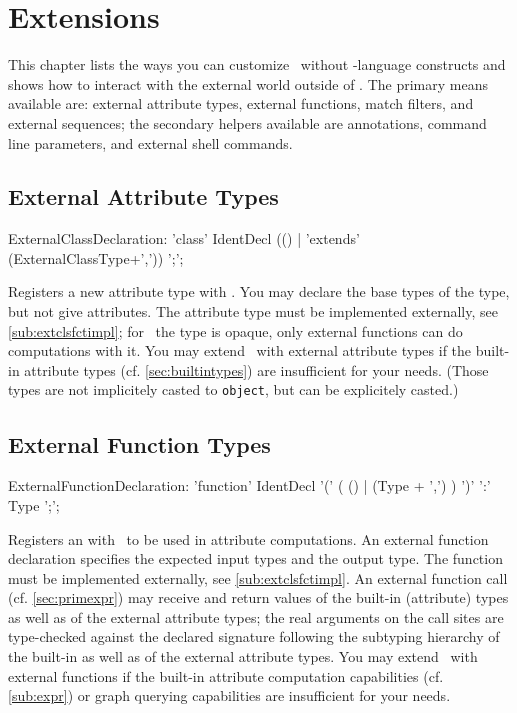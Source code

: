 \chapter{Extensions}\label{chapextensions}

This chapter lists the ways you can customize \GrG~without \GrG-language constructs and
shows how to interact with the external world outside of \GrG.
The primary means available are: external attribute types, external functions, match filters, and external sequences; the secondary helpers available are annotations, command line parameters, and external shell commands.

\section{External Attribute Types}\label{sub:extcls}
\begin{rail}
  ExternalClassDeclaration: 'class' IdentDecl (() | 'extends' (ExternalClassType+',')) ';';
\end{rail}
Registers a new attribute type with \GrG. You may declare the base types of the type, but not give attributes. The attribute type must be implemented externally, see \ref{sub:extclsfctimpl}; for \GrG~the type is opaque, only external functions can do computations with it. You may extend \GrG~with external attribute types if the built-in attribute types (cf. \ref{sec:builtintypes}) are insufficient for your needs.
(Those types are not implicitely casted to \texttt{object}, but can be explicitely casted.)

\section{External Function Types}\label{sub:extfct}
\begin{rail}
  ExternalFunctionDeclaration: 'function' IdentDecl '(' ( () | (Type + ',') ) ')' ':' Type ';';
\end{rail}
Registers an  with \GrG~to be used in attribute computations.
An external function declaration specifies the expected input types and the output type. The function must be implemented externally, see \ref{sub:extclsfctimpl}.
An external function call (cf. \ref{sec:primexpr}) may receive and return values of the built-in (attribute) types as well as of the external attribute types; the real arguments on the call sites are type-checked against the declared signature following the subtyping hierarchy of the built-in as well as of the external attribute types.
You may extend \GrG~with external functions if the built-in attribute computation capabilities (cf. \ref{sub:expr}) or graph querying capabilities are insufficient for your needs.

